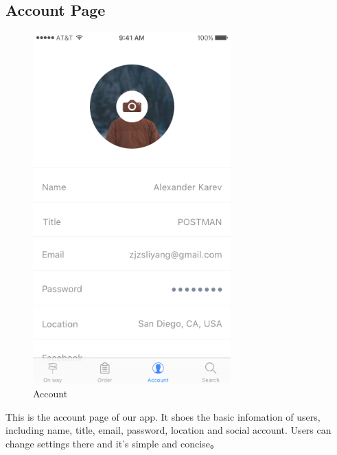 \documentclass[12pt]{scrreprt}
\begin{document}
\subsection{Account Page}
\begin{figure}[H]
  \centering\includegraphics[width=3in]{DocumentRes/Account.png}
  \caption{Account}
\end{figure}
This is the account page of our app. It shoes the basic infomation of users,
including name, title, email, password, location and social account. Users can
change settings there and it's simple and concise。
\end{document}
